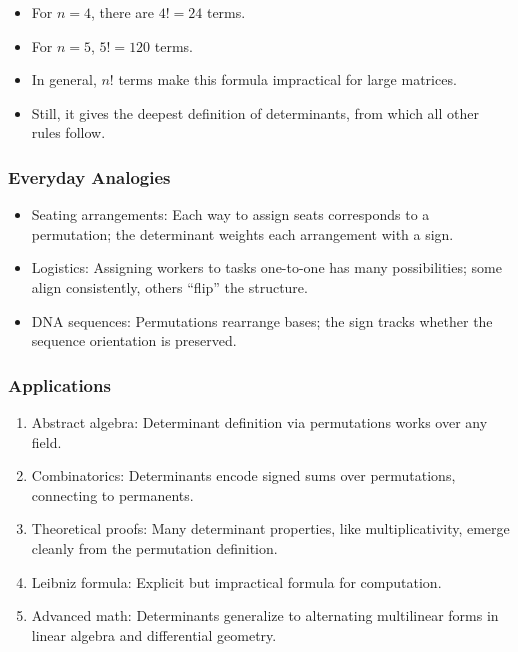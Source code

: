 \documentclass[
  letterpaper,
  DIV=11,
  numbers=noendperiod]{scrreprt}
\providecommand{\tightlist}{%
  \setlength{\itemsep}{0pt}\setlength{\parskip}{0pt}}
\begin{document}
\begin{itemize}
\tightlist
\item
  For \(n=4\), there are \(4! = 24\) terms.
\item
  For \(n=5\), \(5! = 120\) terms.
\item
  In general, \(n!\) terms make this formula impractical for large
  matrices.
\item
  Still, it gives the deepest definition of determinants, from which all
  other rules follow.
\end{itemize}

\subsubsection{Everyday Analogies}\label{everyday-analogies-54}

\begin{itemize}
\tightlist
\item
  Seating arrangements: Each way to assign seats corresponds to a
  permutation; the determinant weights each arrangement with a sign.
\item
  Logistics: Assigning workers to tasks one-to-one has many
  possibilities; some align consistently, others ``flip'' the structure.
\item
  DNA sequences: Permutations rearrange bases; the sign tracks whether
  the sequence orientation is preserved.
\end{itemize}

\subsubsection{Applications}\label{applications-20}

\begin{enumerate}
\def\labelenumi{\arabic{enumi}.}
\tightlist
\item
  Abstract algebra: Determinant definition via permutations works over
  any field.
\item
  Combinatorics: Determinants encode signed sums over permutations,
  connecting to permanents.
\item
  Theoretical proofs: Many determinant properties, like
  multiplicativity, emerge cleanly from the permutation definition.
\item
  Leibniz formula: Explicit but impractical formula for computation.
\item
  Advanced math: Determinants generalize to alternating multilinear
  forms in linear algebra and differential geometry.
\end{enumerate}
\end{document}
